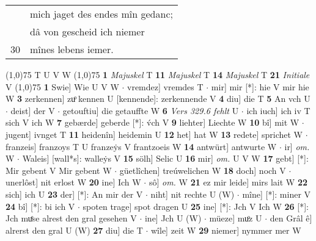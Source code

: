 \documentclass[8pt,a4paper,notitlepage]{article}
\begin{document}
\begin{table}[ht]
\begin{minipage}[t]{0.5\linewidth}
\begin{tabular}{rl}
 & mich jaget des endes mîn gedanc;\\ 
 & dâ von gescheid ich niemer\\ 
30 & mînes lebens iemer.\\ 
\end{tabular}
\scriptsize
\line(1,0){75} \newline
T U V W \newline
\line(1,0){75} \newline
\textbf{1} \textit{Majuskel} T  \textbf{11} \textit{Majuskel} T  \textbf{14} \textit{Majuskel} T  \textbf{21} \textit{Initiale} V  \newline
\line(1,0){75} \newline
\textbf{1} Swie] Wie U V W  $\cdot$ vremdez] vremdes T  $\cdot$ mir] mir [*]: hie V mir hie W \textbf{3} zerkennen] zuͦ kennen U [kennende]: zerkennende V \textbf{4} diu] die T \textbf{5} An vch U  $\cdot$ deist] der V  $\cdot$ getouftiu] die getauffte W \textbf{6} \textit{Vers 329.6 fehlt} U   $\cdot$ ich iuch] ich iv T sich V ich W \textbf{7} gebærde] geberde [*]: v́ch V \textbf{9} liehter] Liechte W \textbf{10} bî] mit W  $\cdot$ jugent] ivnget T \textbf{11} heidenîn] heidemin U \textbf{12} het] hat W \textbf{13} redete] sprichet W  $\cdot$ franzeis] franzoys T U franzeẏs V frantzoeis W \textbf{14} antwürt] antwurte W  $\cdot$ ir] \textit{om.} W  $\cdot$ Waleis] [wall*s]: walleẏs V \textbf{15} sölh] Selic U \textbf{16} mir] \textit{om.} U V W \textbf{17} gebt] [*]: Mir gebent V Mir gebent W  $\cdot$ güetlîchen] treúwelichen W \textbf{18} doch] noch V  $\cdot$ unerlôst] nit erlost W \textbf{20} ine] Ich W  $\cdot$ sô] \textit{om.} W \textbf{21} ez mir leide] mirs lait W \textbf{22} sich] ich U \textbf{23} der] [*]: An mir der V  $\cdot$ niht] nit rechte U (W)  $\cdot$ mîne] [*]: miner V \textbf{24} bî] [*]: bi ich V  $\cdot$ spoten trage] spot dragen U \textbf{25} ine] [*]: Jch V Ich W \textbf{26} [*]: Jch muͤse alrest den gral gesehen V  $\cdot$ ine] Jch U (W)  $\cdot$ müeze] muͦz U  $\cdot$ den Grâl ê] alrerst den gral U (W) \textbf{27} diu] die T  $\cdot$ wîle] zeit W \textbf{29} niemer] nymmer mer W \newline
\end{minipage}
\end{table}
\end{document}
